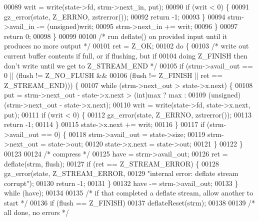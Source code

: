 \begin{DoxyCode}
00089             writ = write(state->fd, strm->next\_in, put);
00090             \textcolor{keywordflow}{if} (writ < 0) \{
00091                 gz\_error(state, Z\_ERRNO, zstrerror());
00092                 \textcolor{keywordflow}{return} -1;
00093             \}
00094             strm->avail\_in -= (unsigned)writ;
00095             strm->next\_in += writ;
00096         \}
00097         \textcolor{keywordflow}{return} 0;
00098     \}
00099 
00100     \textcolor{comment}{/* run deflate() on provided input until it produces no more output */}
00101     ret = Z\_OK;
00102     \textcolor{keywordflow}{do} \{
00103         \textcolor{comment}{/* write out current buffer contents if full, or if flushing, but if}
00104 \textcolor{comment}{           doing Z\_FINISH then don't write until we get to Z\_STREAM\_END */}
00105         \textcolor{keywordflow}{if} (strm->avail\_out == 0 || (flush != Z\_NO\_FLUSH &&
00106             (flush != Z\_FINISH || ret == Z\_STREAM\_END))) \{
00107             \textcolor{keywordflow}{while} (strm->next\_out > state->x.next) \{
00108                 put = strm->next\_out - state->x.next > (int)max ? max :
00109                       (\textcolor{keywordtype}{unsigned})(strm->next\_out - state->x.next);
00110                 writ = write(state->fd, state->x.next, put);
00111                 \textcolor{keywordflow}{if} (writ < 0) \{
00112                     gz\_error(state, Z\_ERRNO, zstrerror());
00113                     \textcolor{keywordflow}{return} -1;
00114                 \}
00115                 state->x.next += writ;
00116             \}
00117             \textcolor{keywordflow}{if} (strm->avail\_out == 0) \{
00118                 strm->avail\_out = state->size;
00119                 strm->next\_out = state->out;
00120                 state->x.next = state->out;
00121             \}
00122         \}
00123 
00124         \textcolor{comment}{/* compress */}
00125         have = strm->avail\_out;
00126         ret = deflate(strm, flush);
00127         \textcolor{keywordflow}{if} (ret == Z\_STREAM\_ERROR) \{
00128             gz\_error(state, Z\_STREAM\_ERROR,
00129                       \textcolor{stringliteral}{"internal error: deflate stream corrupt"});
00130             \textcolor{keywordflow}{return} -1;
00131         \}
00132         have -= strm->avail\_out;
00133     \} \textcolor{keywordflow}{while} (have);
00134 
00135     \textcolor{comment}{/* if that completed a deflate stream, allow another to start */}
00136     \textcolor{keywordflow}{if} (flush == Z\_FINISH)
00137         deflateReset(strm);
00138 
00139     \textcolor{comment}{/* all done, no errors */}

\end{DoxyCode}
